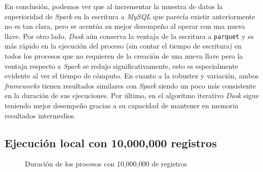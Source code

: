En conclusión, podemos ver que al incrementar la muestra de datos la superioridad de \textit{Spark} en la escritura a \textit{MySQL} que parecía existir anteriormente no es tan clara, pero se acentúa su mejor desempeño al operar con una nueva llave. Por otro lado, \textit{Dask} aún conserva la ventaja de la escritura a \texttt{parquet} y es más rápido en la ejecución del proceso (sin contar el tiempo de escritura) en todos los procesos que no requieren de la creación de una nueva llave pero la ventaja respecto a \textit{Spark} se redujo significativamente, esto es especialmente evidente al ver el tiempo de cómputo. En cuanto a la robustez y variación, ambos \textit{frameworks} tienen resultados similares con \textit{Spark} siendo un poco más consistente en la duración de sus ejecuciones. Por último, en el algoritmo iterativo \textit{Dask} sigue teniendo mejor desempeño gracias a su capacidad de mantener en memoria resultados intermedios.

\subsection{Ejecución local con 10,000,000 registros}

\begin{center}
\begin{figure}
\caption{Duración de los procesos con 10,000,000 de registros}
\label{barras:duracion10M}
\end{figure}
\end{center}

